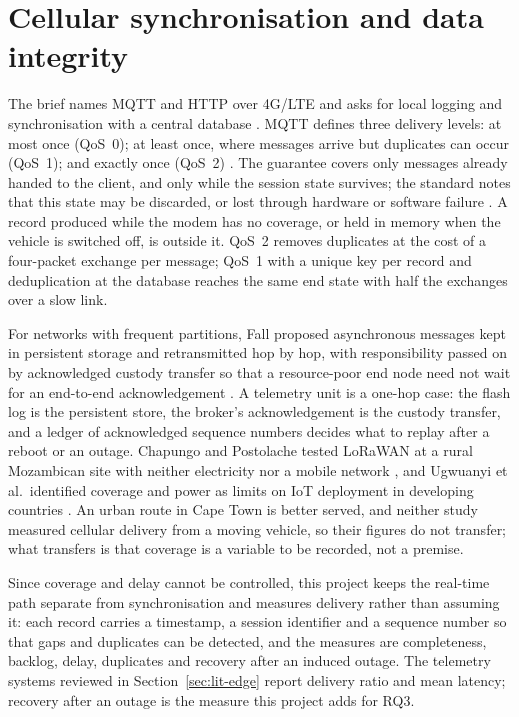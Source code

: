 \section{Cellular synchronisation and data integrity}
\label{sec:lit-sync}

The brief names MQTT and HTTP over 4G/LTE and asks for local logging and synchronisation with a central database \cite{winberg2026}. MQTT defines three delivery levels: at most once (QoS~0); at least once, where messages arrive but duplicates can occur (QoS~1); and exactly once (QoS~2) \cite{mqtt311}. The guarantee covers only messages already handed to the client, and only while the session state survives; the standard notes that this state may be discarded, or lost through hardware or software failure \cite{mqtt311}. A record produced while the modem has no coverage, or held in memory when the vehicle is switched off, is outside it. QoS~2 removes duplicates at the cost of a four-packet exchange per message; QoS~1 with a unique key per record and deduplication at the database reaches the same end state with half the exchanges over a slow link.

For networks with frequent partitions, Fall proposed asynchronous messages kept in persistent storage and retransmitted hop by hop, with responsibility passed on by acknowledged custody transfer so that a resource-poor end node need not wait for an end-to-end acknowledgement \cite{fall2003}. A telemetry unit is a one-hop case: the flash log is the persistent store, the broker's acknowledgement is the custody transfer, and a ledger of acknowledged sequence numbers decides what to replay after a reboot or an outage. Chapungo and Postolache tested LoRaWAN at a rural Mozambican site with neither electricity nor a mobile network \cite{chapungo2025}, and Ugwuanyi et al.\ identified coverage and power as limits on IoT deployment in developing countries \cite{ugwuanyi2021}. An urban route in Cape Town is better served, and neither study measured cellular delivery from a moving vehicle, so their figures do not transfer; what transfers is that coverage is a variable to be recorded, not a premise.

Since coverage and delay cannot be controlled, this project keeps the real-time path separate from synchronisation and measures delivery rather than assuming it: each record carries a timestamp, a session identifier and a sequence number so that gaps and duplicates can be detected, and the measures are completeness, backlog, delay, duplicates and recovery after an induced outage. The telemetry systems reviewed in Section~\ref{sec:lit-edge} report delivery ratio and mean latency; recovery after an outage is the measure this project adds for RQ3.

